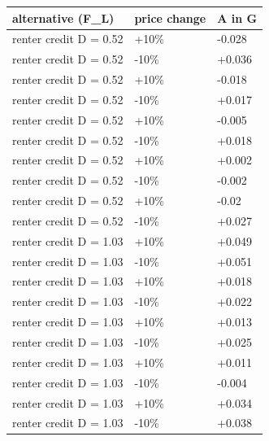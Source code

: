 \begingroup\small
\setlength{\tabcolsep}{3pt}
\renewcommand{\arraystretch}{1.04}
\begin{tabularx}{\linewidth}{XXX}
\toprule
alternative (F\_L) & price change & A in G \\
\midrule
renter credit D = 0.52 & +10\% & -0.028 \\
renter credit D = 0.52 & -10\% & +0.036 \\
renter credit D = 0.52 & +10\% & -0.018 \\
renter credit D = 0.52 & -10\% & +0.017 \\
renter credit D = 0.52 & +10\% & -0.005 \\
renter credit D = 0.52 & -10\% & +0.018 \\
renter credit D = 0.52 & +10\% & +0.002 \\
renter credit D = 0.52 & -10\% & -0.002 \\
renter credit D = 0.52 & +10\% & -0.02 \\
renter credit D = 0.52 & -10\% & +0.027 \\
renter credit D = 1.03 & +10\% & +0.049 \\
renter credit D = 1.03 & -10\% & +0.051 \\
renter credit D = 1.03 & +10\% & +0.018 \\
renter credit D = 1.03 & -10\% & +0.022 \\
renter credit D = 1.03 & +10\% & +0.013 \\
renter credit D = 1.03 & -10\% & +0.025 \\
renter credit D = 1.03 & +10\% & +0.011 \\
renter credit D = 1.03 & -10\% & -0.004 \\
renter credit D = 1.03 & +10\% & +0.034 \\
renter credit D = 1.03 & -10\% & +0.038 \\
\bottomrule
\end{tabularx}
\endgroup

